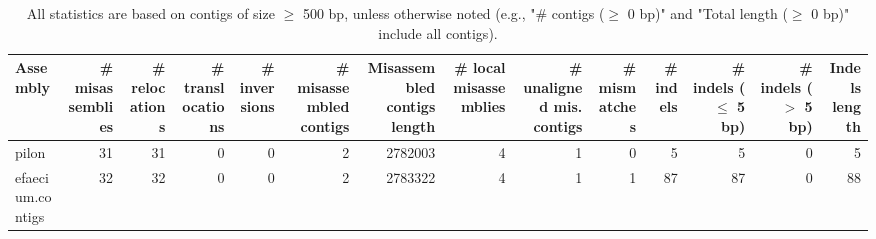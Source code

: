 \documentclass[12pt,a4paper]{article}
\begin{document}
\begin{table}[ht]
\begin{center}
\caption{All statistics are based on contigs of size $\geq$ 500 bp, unless otherwise noted (e.g., "\# contigs ($\geq$ 0 bp)" and "Total length ($\geq$ 0 bp)" include all contigs).}
\begin{tabular}{|l*{13}{|r}|}
\hline
Assembly & \# misassemblies &     \# relocations &     \# translocations &     \# inversions & \# misassembled contigs & Misassembled contigs length & \# local misassemblies & \# unaligned mis. contigs & \# mismatches & \# indels &     \# indels ($\leq$ 5 bp) &     \# indels ($>$ 5 bp) & Indels length \\ \hline
pilon & 31 & 31 & 0 & 0 & 2 & 2782003 & 4 & 1 & 0 & 5 & 5 & 0 & 5 \\ \hline
efaecium.contigs & 32 & 32 & 0 & 0 & 2 & 2783322 & 4 & 1 & 1 & 87 & 87 & 0 & 88 \\ \hline
\end{tabular}
\end{center}
\end{table}
\end{document}
